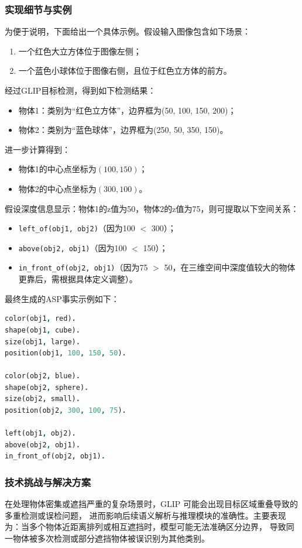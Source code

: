 \subsubsection{实现细节与实例}
为便于说明，下面给出一个具体示例。假设输入图像包含如下场景： 
\begin{enumerate}[nosep] 
    \item 一个红色大立方体位于图像左侧； 
    \item 一个蓝色小球体位于图像右侧，且位于红色立方体的前方。 
\end{enumerate}

经过GLIP目标检测，得到如下检测结果： 
\begin{itemize}[itemsep=0pt,parsep=0pt] 
    \item 物体1：类别为“红色立方体”，边界框为(50, 100, 150, 200)； 
    \item 物体2：类别为“蓝色球体”，边界框为(250, 50, 350, 150)。 
\end{itemize}

进一步计算得到： 
\begin{itemize}[itemsep=0pt,parsep=0pt] 
    \item 物体1的中心点坐标为$(100,150)$； 
    \item 物体2的中心点坐标为$(300,100)$。 
\end{itemize}

假设深度信息显示：物体1的z值为50，物体2的z值为75，则可提取以下空间关系： 
\begin{itemize}[itemsep=0pt,parsep=0pt] 
    \item \texttt{left\_of(obj1, obj2)}（因为100 $<$ 300）； 
    \item \texttt{above(obj2, obj1)}（因为100 $<$ 150）； 
    \item \texttt{in\_front\_of(obj2, obj1)}（因为75 $>$ 50，在三维空间中深度值较大的物体更靠后，需根据具体定义调整）。 
\end{itemize}

最终生成的ASP事实示例如下： 
\begin{lstlisting}[language=Prolog] 
color(obj1, red). 
shape(obj1, cube). 
size(obj1, large). 
position(obj1, 100, 150, 50).

color(obj2, blue). 
shape(obj2, sphere). 
size(obj2, small). 
position(obj2, 300, 100, 75).

left(obj1, obj2). 
above(obj2, obj1). 
in_front_of(obj2, obj1). 
\end{lstlisting}
\subsubsection{技术挑战与解决方案}
在处理物体密集或遮挡严重的复杂场景时，GLIP 可能会出现目标区域重叠导致的多重检测或误检问题，
进而影响后续语义解析与推理模块的准确性。主要表现为：当多个物体近距离排列或相互遮挡时，模型可能无法准确区分边界，
导致同一物体被多次检测或部分遮挡物体被误识别为其他类别。

